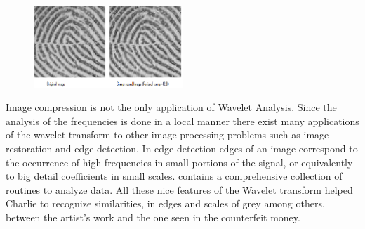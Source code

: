 	\begin{figure}[H]
	   \centering
	   \includegraphics[width=0.5\textwidth]{season1/107/images/fingerprint.png} 
	\end{figure}

Image compression is not the only application of Wavelet Analysis. Since the analysis of the frequencies is done in a local manner there exist many applications of the wavelet transform to other image processing problems such as image restoration and edge detection. In edge detection edges of an image correspond to the occurrence of high frequencies in small portions of the signal, or equivalently to big detail coefficients in small scales.  contains a comprehensive collection of routines to analyze data. All these nice features of the Wavelet transform helped Charlie to recognize similarities, in edges and scales of grey among others, between the artist's work and the one seen in the counterfeit money. \\

 \vspace{0.2cm}

